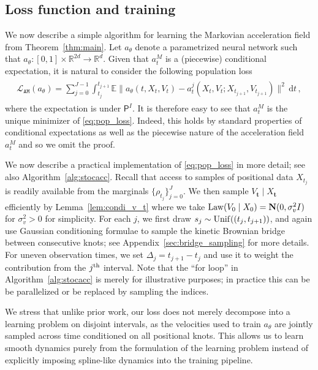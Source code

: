 \documentclass[12pt]{article}
\theoremstyle{plain}
\theoremstyle{plain}
\theoremstyle{remark}
\newcommand{\R}{\mathbb{R}}
\newcommand{\cL}{\mathcal{L}}
\newcommand{\bbE}{\mathbb{E}}
\newcommand{\dd}{\,\mathrm{d}}
\newcommand{\gauss}{\mathbf{N}}
\newcommand{\1}{\bm{1}}
\theoremstyle{plain}
\theoremstyle{definition}
\theoremstyle{remark}
\begin{document}
\subsection{Loss function and training}\label{sec:loss}
We now describe a simple algorithm for learning the Markovian acceleration field from Theorem~\ref{thm:main}. Let $a_\theta$ denote a parametrized neural network such that $a_\theta : [0,1] \times \R^{2d} \to \R^d$. Given that $a_t^M$ is a (piecewise) conditional expectation, it is natural to consider the following population loss
\begin{align}\label{eq:pop_loss}
\begin{split}
        \cL_{\texttt{AM}}(a_\theta) = \sum_{j=0}^{J-1}\int_{t_j}^{t_{j+1}} \bbE\| a_\theta(t,X_t,V_t) - a_t^j(X_t,V_t;X_{t_{j+1}},V_{t_{j+1}})\|^2
        \dd t\,,
\end{split}
\end{align}
where the expectation is under $\mathsf P^I$.
It is therefore easy to see that $a_t^M$ is the unique minimizer of \eqref{eq:pop_loss}. Indeed, this holds by standard properties of conditional expectations as well as the piecewise nature of the acceleration field $a_t^M$ and so we omit the proof.

We now describe a practical implementation of \eqref{eq:pop_loss} in more detail; see also Algorithm~\ref{alg:stocacc}.
Recall that access to samples of positional data $X_{t_j}$ is readily available from the marginals $\{\rho_{t_j}\}_{j=0}^{J}$.
We then sample $V_{\bm t}\mid X_{\bm t}$ efficiently by Lemma~\ref{lem:condi_v_t} where we take ${\rm Law}(V_0\mid X_0) = \gauss(0,\sigma_v^2I)$ for $\sigma_v^2 >0$ for simplicity.
For each $j$, we first draw $s_j \sim {\rm Unif}((t_j, t_{j+1}))$, and again use Gaussian conditioning formulae to sample the kinetic Brownian bridge between consecutive knots; see Appendix~\ref{sec:bridge_sampling} for more details. {For uneven observation times, we set $\Delta_j = t_{j+1}-t_j$ and use it to weight the contribution from the $j^{\rm th}$ interval.} Note that the ``for loop'' in Algorithm~\ref{alg:stocacc} is merely for illustrative purposes; in practice this can be be parallelized or be replaced by sampling the indices.

We stress that unlike prior work, our loss does not merely decompose into a learning problem on disjoint intervals, as the velocities used to train $a_\theta$ are jointly sampled across time conditioned on all positional knots. This allows us to learn smooth dynamics purely from the formulation of the learning problem instead of explicitly imposing spline-like dynamics into the training pipeline.
\end{document}
